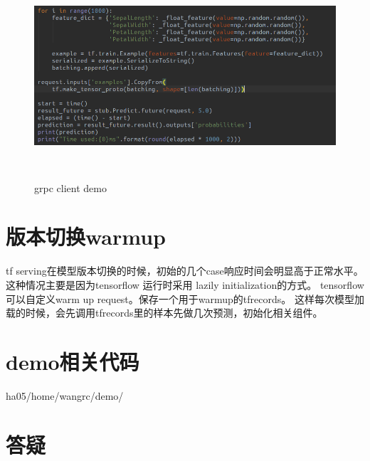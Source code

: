 \documentclass[12pt,a4paper,oneside]{article}
\begin{document}
\begin{CJK*}{UTF8}{gbsn}
\begin{figure}[H]
\centering
\includegraphics[width=6in,height=3.0in]{grpcclient}
\caption{grpc client demo}
\end{figure}


\section{版本切换warmup}
tf serving在模型版本切换的时候，初始的几个case响应时间会明显高于正常水平。这种情况主要是因为tensorflow 运行时采用 lazily initialization的方式。 tensorflow可以自定义warm up request。保存一个用于warmup的tfrecords。 这样每次模型加载的时候，会先调用tfrecords里的样本先做几次预测，初始化相关组件。

\section{demo相关代码}
ha05/home/wangrc/demo/ 
\section{答疑}

\end{CJK*}
\end{document}
